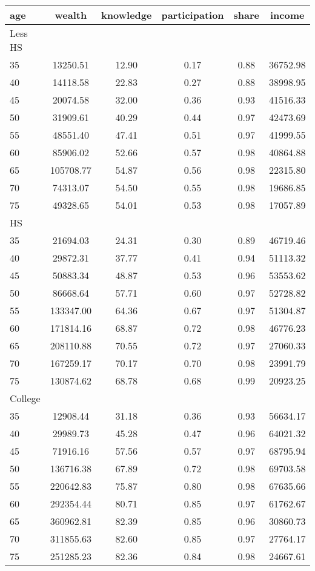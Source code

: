  \begin{tabular}{lccccc}
 \hline \hline
  age & wealth & knowledge & participation & share & income \\
 \hline
 Less HS & & & & & \\
 \hline
35 &  13250.51 &     12.90 &      0.17 &      0.88 &  36752.98 \\ 
40 &  14118.58 &     22.83 &      0.27 &      0.88 &  38998.95 \\ 
45 &  20074.58 &     32.00 &      0.36 &      0.93 &  41516.33 \\ 
50 &  31909.61 &     40.29 &      0.44 &      0.97 &  42473.69 \\ 
55 &  48551.40 &     47.41 &      0.51 &      0.97 &  41999.55 \\ 
60 &  85906.02 &     52.66 &      0.57 &      0.98 &  40864.88 \\ 
65 & 105708.77 &     54.87 &      0.56 &      0.98 &  22315.80 \\ 
70 &  74313.07 &     54.50 &      0.55 &      0.98 &  19686.85 \\ 
75 &  49328.65 &     54.01 &      0.53 &      0.98 &  17057.89 \\ 
 \hline
 HS & & & & & \\
 \hline
35 &  21694.03 &     24.31 &      0.30 &      0.89 &  46719.46 \\ 
40 &  29872.31 &     37.77 &      0.41 &      0.94 &  51113.32 \\ 
45 &  50883.34 &     48.87 &      0.53 &      0.96 &  53553.62 \\ 
50 &  86668.64 &     57.71 &      0.60 &      0.97 &  52728.82 \\ 
55 & 133347.00 &     64.36 &      0.67 &      0.97 &  51304.87 \\ 
60 & 171814.16 &     68.87 &      0.72 &      0.98 &  46776.23 \\ 
65 & 208110.88 &     70.55 &      0.72 &      0.97 &  27060.33 \\ 
70 & 167259.17 &     70.17 &      0.70 &      0.98 &  23991.79 \\ 
75 & 130874.62 &     68.78 &      0.68 &      0.99 &  20923.25 \\ 
 \hline
 College & & & & & \\
 \hline
35 &  12908.44 &     31.18 &      0.36 &      0.93 &  56634.17 \\ 
40 &  29989.73 &     45.28 &      0.47 &      0.96 &  64021.32 \\ 
45 &  71916.16 &     57.56 &      0.57 &      0.97 &  68795.94 \\ 
50 & 136716.38 &     67.89 &      0.72 &      0.98 &  69703.58 \\ 
55 & 220642.83 &     75.87 &      0.80 &      0.98 &  67635.66 \\ 
60 & 292354.44 &     80.71 &      0.85 &      0.97 &  61762.67 \\ 
65 & 360962.81 &     82.39 &      0.85 &      0.96 &  30860.73 \\ 
70 & 311855.63 &     82.60 &      0.85 &      0.97 &  27764.17 \\ 
75 & 251285.23 &     82.36 &      0.84 &      0.98 &  24667.61 \\ 
 \hline \hline
 \end{tabular}
